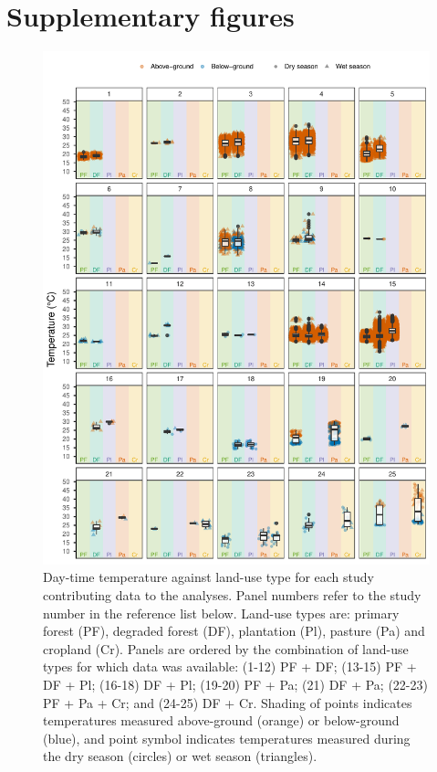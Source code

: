 \documentclass[12pt,a4paper,]{report}
\theoremstyle{definition}
\theoremstyle{definition}
\theoremstyle{definition}
\theoremstyle{remark}
\begin{document}
\section{Supplementary figures}\label{supplementary-figures-1}

\begin{figure}
\centering
\includegraphics{./output/fig-B-1-1-1.pdf}
\caption{\label{fig:fig-B-1-1}Day-time temperature against land-use type for
each study contributing data to the analyses. Panel numbers refer to the
study number in the reference list below. Land-use types are: primary
forest (PF), degraded forest (DF), plantation (Pl), pasture (Pa) and
cropland (Cr). Panels are ordered by the combination of land-use types
for which data was available: (1-12) PF + DF; (13-15) PF + DF + Pl;
(16-18) DF + Pl; (19-20) PF + Pa; (21) DF + Pa; (22-23) PF + Pa + Cr;
and (24-25) DF + Cr. Shading of points indicates temperatures measured
above-ground (orange) or below-ground (blue), and point symbol indicates
temperatures measured during the dry season (circles) or wet season
(triangles).}
\end{figure}
\end{document}
